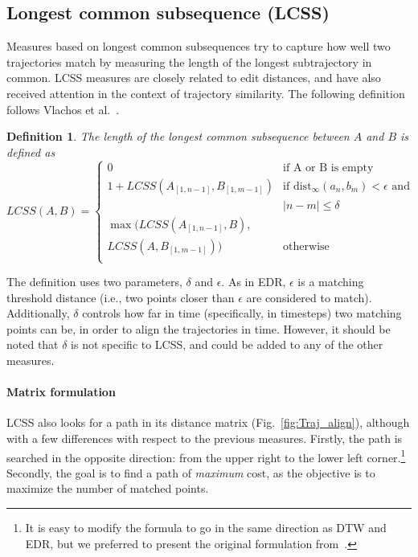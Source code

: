 \documentclass[10pt,letterpaper]{article}
\newcommand{\dist}{\ensuremath{\text{dist}}}
\newtheorem{definition}{Definition}
\begin{document}
\subsection{Longest common subsequence (LCSS)}
Measures based on longest common subsequences try to capture how well two trajectories match by measuring the length of the longest subtrajectory in common.
LCSS measures are closely related to edit distances, and have also received attention in the context of trajectory similarity.
The following definition follows Vlachos et al.~\cite{VlachosGK02}.

\begin{definition}
The length of the longest common subsequence between $A$ and $B$ is defined as
\[
LCSS(A,B) =
\left\{
	\begin{array}{ll}
		0  & \mbox{if A or B is empty} \\
		1+LCSS(A_{[1,n-1]},B_{[1,m-1]}) & \mbox{if } \dist_\infty(a_n,b_m) < \epsilon  \mbox{ and } \\ &|n-m| \leq \delta \\
		\max( LCSS(A_{[1,n-1]},B), \\ LCSS(A,B_{[1,m-1]})) & \mbox{otherwise } \\
		\end{array}
\right.
\]
\end{definition}

The definition uses two parameters, $\delta$ and $\epsilon$.
As in EDR, $\epsilon$ is a matching threshold distance (i.e., two points closer than $\epsilon$ are considered to match).
Additionally, $\delta$ controls how far in time (specifically, in timesteps) two matching points can be, in order to align the trajectories in time.
However, it should be noted that $\delta$ is not specific to LCSS, and could be added to any of the other measures.

\paragraph{Matrix formulation}
LCSS also looks for a path in its distance matrix (Fig.~\ref{fig:Traj_align}), although with a few differences with respect to the previous measures.
Firstly, the path is searched in the opposite direction: from the upper right to the lower left corner.\footnote{It is easy to modify the formula to go in the same direction as DTW and EDR, but we preferred to present the original formulation from~\cite{VlachosGK02}.}
Secondly, the goal is to find a path of \emph{maximum} cost, as the objective is to maximize the number of matched points.
\end{document}
